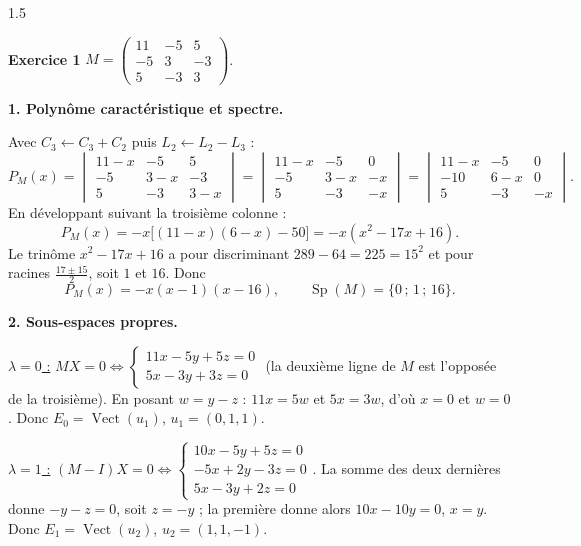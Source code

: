\documentclass[12pt]{article}
\begin{document}
\begin{spacing}{1.5}


\textbf{Exercice 1} \quad $M=\begin{pmatrix}11&-5&5\\-5&3&-3\\5&-3&3\end{pmatrix}$.

\textbf{1. Polynôme caractéristique et spectre.}

Avec $C_3\leftarrow C_3+C_2$ puis $L_2\leftarrow L_2-L_3$ :
\[
P_M(x)=\begin{vmatrix}11-x&-5&5\\-5&3-x&-3\\5&-3&3-x\end{vmatrix}
=\begin{vmatrix}11-x&-5&0\\-5&3-x&-x\\5&-3&-x\end{vmatrix}
=\begin{vmatrix}11-x&-5&0\\-10&6-x&0\\5&-3&-x\end{vmatrix}.
\]
En développant suivant la troisième colonne :
\[
P_M(x)=-x\big[(11-x)(6-x)-50\big]=-x(x^2-17x+16).
\]
Le trinôme $x^2-17x+16$ a pour discriminant $289-64=225=15^2$ et pour racines $\frac{17\pm15}{2}$, soit $1$ et $16$. Donc
\[
\boxed{P_M(x)=-x(x-1)(x-16)},\qquad\boxed{\operatorname{Sp}(M)=\{0\,;\,1\,;\,16\}}.
\]

\textbf{2. Sous-espaces propres.}

\underline{$\lambda=0$ :} $MX=0\iff\begin{cases}11x-5y+5z=0\\5x-3y+3z=0\end{cases}$ (la deuxième ligne de $M$ est l'opposée de la troisième). En posant $w=y-z$ : $11x=5w$ et $5x=3w$, d'où $x=0$ et $w=0$. Donc $E_0=\operatorname{Vect}(u_1)$, $u_1=(0,1,1)$.

\underline{$\lambda=1$ :} $(M-I)X=0\iff\begin{cases}10x-5y+5z=0\\-5x+2y-3z=0\\5x-3y+2z=0\end{cases}$. La somme des deux dernières donne $-y-z=0$, soit $z=-y$ ; la première donne alors $10x-10y=0$, $x=y$. Donc $E_1=\operatorname{Vect}(u_2)$, $u_2=(1,1,-1)$.


\end{spacing}
\end{document}
